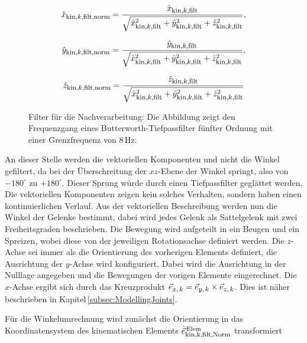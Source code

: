 \begin{equation}
    \hat{x}_{\textrm{\footnotesize{kin,$k$,filt,norm}}} = \frac{\hat{x}_{\textrm{\footnotesize{kin,$k$,filt}}}}{\sqrt{\hat{x}_{\textrm{\footnotesize{kin,$k$,filt}}}^2 + \hat{y}_{\textrm{\footnotesize{kin,$k$,filt}}}^2 + \hat{z}_{\textrm{\footnotesize{kin,$k$,filt}}}^2 }},
\end{equation}

\begin{equation}
    \hat{y}_{\textrm{\footnotesize{kin,$k$,filt,norm}}} = \frac{\hat{y}_{\textrm{\footnotesize{kin,$k$,filt}}}}{\sqrt{\hat{x}_{\textrm{\footnotesize{kin,$k$,filt}}}^2 + \hat{y}_{\textrm{\footnotesize{kin,$k$,filt}}}^2 + \hat{z}_{\textrm{\footnotesize{kin,$k$,filt}}}^2 }},
\end{equation}

\begin{equation}
    \hat{z}_{\textrm{\footnotesize{kin,$k$,filt,norm}}} = \frac{\hat{z}_{\textrm{\footnotesize{kin,$k$,filt}}}}{\sqrt{\hat{x}_{\textrm{\footnotesize{kin,$k$,filt}}}^2 + \hat{y}_{\textrm{\footnotesize{kin,$k$,filt}}}^2 + \hat{z}_{\textrm{\footnotesize{kin,$k$,filt}}}^2 }}
\end{equation}

\begin{figure}
    \centering
    \caption{Filter für die Nachverarbeitung: Die Abbildung zeigt den Frequenzgang eines Butterworth-Tiefpassfilter fünfter Ordnung mit einer Grenzfrequenz von 8\,Hz.}
    \label{fig:Filterpost}
\end{figure}
An dieser Stelle werden die vektoriellen Komponenten und nicht die Winkel gefiltert, da bei der Überschreitung der $xz$-Ebene der Winkel springt, also von $-180^\circ$ zu $+180^\circ$. Dieser Sprung würde durch einen Tiefpassfilter geglättet werden. Die vektoriellen Komponenten zeigen kein solches Verhalten, sondern haben einen kontinuierlichen Verlauf. Aus der vektoriellen Beschreibung werden nun die Winkel der Gelenke bestimmt, dabei wird jedes Gelenk als Sattelgelenk mit zwei Freiheitsgraden beschrieben. Die Bewegung wird aufgeteilt in ein Beugen und ein Spreizen, wobei diese von der jeweiligen Rotationsachse definiert werden. Die $z$-Achse sei immer als die Orientierung des vorherigen Elements definiert, die Ausrichtung der $y$-Achse wird konfiguriert. Dabei wird die Ausrichtung in der Nulllage angegeben und die Bewegungen der vorigen Elemente eingerechnet. Die $x$-Achse ergibt sich durch das Kreuzprodukt $\vec{e}_{\textrm{\footnotesize{$x,k$}}} = \vec{e}_{\textrm{\footnotesize{$y,k$}}}\times \vec{e}_{\textrm{\footnotesize{$z,k$}}}$. Dies ist näher beschrieben in Kapitel\,\ref{subsec:ModellingJoints}. 

Für die Winkelumrechnung wird zunächst die Orientierung in das Koordinatensystem des kinematischen Elements $\hat{\vec{e}}_{\textrm{\footnotesize{kin,k,filt,Norm}}}^\text{\,Elem}$ transformiert

